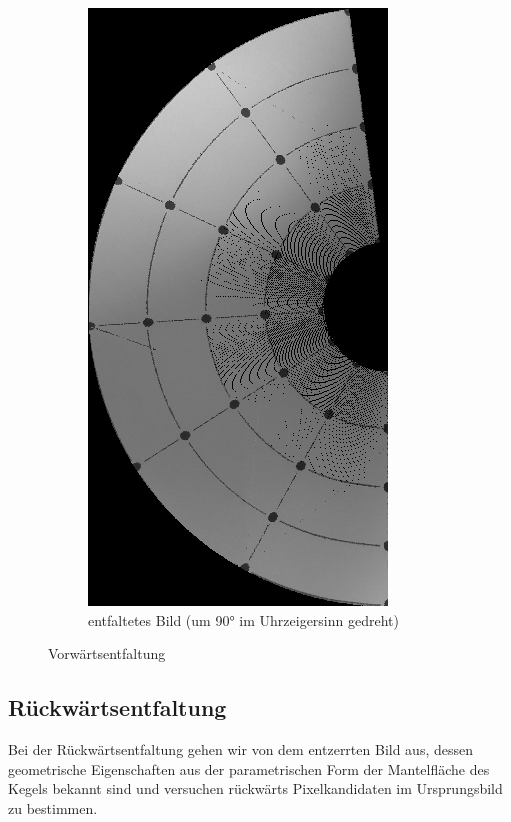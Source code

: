 \begin{figure}[!htb]
\begin{subfigure}{.5\textwidth}
		\includegraphics[angle=-90, width=.9\textwidth]{images/coneRaspUnWarpForward.png}
		\caption{entfaltetes Bild (um 90° im Uhrzeigersinn gedreht)}
	\end{subfigure}
	\caption{Vorwärtsentfaltung}
	\label{fig:forwardUnfold}
\end{figure}


\subsection{Rückwärtsentfaltung}
Bei der Rückwärtsentfaltung gehen wir von dem entzerrten Bild aus, dessen geometrische Eigenschaften aus der parametrischen Form der Mantelfläche des Kegels bekannt sind und versuchen rückwärts Pixelkandidaten im Ursprungsbild zu bestimmen.

